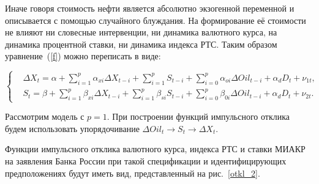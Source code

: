 \documentclass[14pt,a4paper, oneside]{extreport}
\def \a{\alpha}
\def \b{\beta}
\def \Dt{\Delta}
\theoremstyle{plain}              %
\theoremstyle{definition}         %
\begin{document}
Иначе говоря стоимость нефти является абсолютно экзогенной переменной и описывается с помощью случайного блуждания. На формирование её стоимости не влияют ни словесные интервенции, ни динамика валютного курса, на динамика процентной ставки, ни динамика индекса РТС. Таким образом уравнение~(\ref{f}) можно переписать в виде:  

\begin{equation}
\left\{
\begin{aligned}
&\Dt X_t = \a + \sum_{i=1}^p \a_{xi} \Dt X_{t-i} + \sum_{i=1}^p S_{t-i} + \sum_{i=0}^p \a_{oi} \Dt Oil_{t-i}+\a_d D_t +  \nu_{1t}, \\
&S_t = \b + \sum_{i=1}^p \b_{xi} \Dt X_{t-i} + \sum_{i=1}^p\b_{si} S_{t-i} + \sum_{i=0}^p \b_{0i} \Dt Oil_{t-i} + \a_d D_t +  \nu_{2t}.
\end{aligned}
\right.
\end{equation}

Рассмотрим модель с $p=1$. При построении функций импульсного отклика будем использовать упорядочивание $ \Dt Oil_t \to S_t \to \Dt X_t$.

Функции импульсного отклика валютного курса, индекса РТС и ставки МИАКР на заявления Банка России при такой спецификации и идентифицирующих предположениях будут иметь вид, представленный на рис.~\ref{otkl_2}. 
\end{document}
